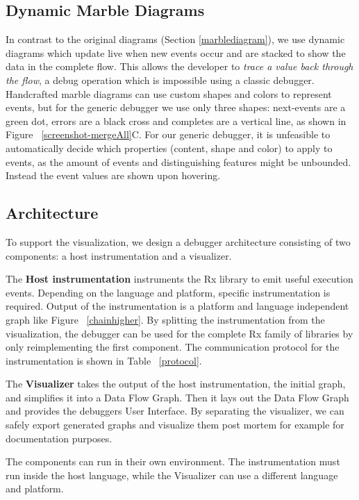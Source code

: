 \subsection{Dynamic Marble Diagrams} In contrast to the original
diagrams (Section%
\ref{marblediagram}), we use dynamic diagrams which update live when new
events occur and are stacked to show the data in the complete flow.
This allows the developer to \emph{trace a value back through the flow},
a debug operation which is impossible using a classic debugger.
Handcrafted marble diagrams can use custom shapes and colors to
represent events, but for the generic debugger we use only three shapes:
next-events are a green dot, errors are a black cross and completes are
a vertical line, as shown in Figure~%
\ref{screenshot-mergeAll}C.  For our generic debugger, it is unfeasible
to automatically decide which properties (content, shape and color) to
apply to events, as the amount of events and distinguishing features
might be unbounded.  Instead the event values are shown upon hovering.

\subsection{Architecture} To support the visualization, we design a
debugger architecture consisting of two components:  a host
instrumentation and a visualizer.

The \textbf{Host instrumentation} instruments the Rx library to emit
useful execution events.  Depending on the language and platform,
specific instrumentation is required.  Output of the instrumentation is
a platform and language independent graph like Figure~%
\ref{chainhigher}.  By splitting the instrumentation from the
visualization, the debugger can be used for the complete Rx family of
libraries by only reimplementing the first component.  The communication
protocol for the instrumentation is shown in Table~%
\ref{protocol}.

The \textbf{Visualizer} takes the output of the host instrumentation,
the initial graph, and simplifies it into a Data Flow Graph.  Then it
lays out the Data Flow Graph and provides the debuggers User Interface.
By separating the visualizer, we can safely export generated graphs and
visualize them post mortem for example for documentation purposes.

The components can run in their own environment.  The instrumentation
must run inside the host language, while the Visualizer can use a
different language and platform.

